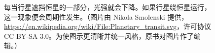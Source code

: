 \begin{figure}[!htbp]
\centering
{}
\caption{每当行星遮挡恒星的一部分，光强就会下降。如果行星绕恒星运行，这一现象便会周期性发生。（图片由 Nikola Smolenski 提供，\url{https://en.wikipedia.org/wiki/File:Planetary_transit.svg}，许可协议 CC BY-SA 3.0。为使图示更清晰并统一风格，原书对图片作了编辑。）}
\label{fig:ch08-transit}
\end{figure}
